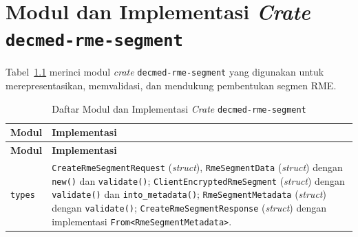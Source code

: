 \chapter{Modul dan Implementasi \textit{Crate} \texttt{decmed-rme-segment}}
\label{lampiran:implementasi-crate-decmed-rme-segment}

Tabel~\ref{tab:modul-crate-decmed-rme-segment} merinci modul \textit{crate} \texttt{decmed-rme-segment} yang digunakan untuk merepresentasikan, memvalidasi, dan mendukung pembentukan segmen RME.

\begingroup
\small
\begin{longtable}{|>{\raggedright\arraybackslash}p{}|>{\raggedright\arraybackslash}p{}|}
	\caption{Daftar Modul dan Implementasi \textit{Crate} \texttt{decmed-rme-segment}}
	\label{tab:modul-crate-decmed-rme-segment}                                                                                                                                                                                                                                                                                                                                                                                                                        \\
	\hline
	\textbf{Modul} & \textbf{Implementasi}                                                                                                                                                                                                                                                                                                                                                                                                                            \\
	\hline
	\endfirsthead
	\hline
	\textbf{Modul} & \textbf{Implementasi}                                                                                                                                                                                                                                                                                                                                                                                                                            \\
	\hline
	\endhead

	\texttt{types}
	               & \texttt{CreateRmeSegmentRequest} (\textit{struct}), \texttt{RmeSegmentData} (\textit{struct}) dengan \texttt{new()} dan \texttt{validate()}; \texttt{ClientEncryptedRmeSegment} (\textit{struct}) dengan \texttt{validate()} dan \texttt{into\_metadata()}; \texttt{RmeSegmentMetadata} (\textit{struct}) dengan \texttt{validate()}; \texttt{CreateRmeSegmentResponse} (\textit{struct}) dengan implementasi \texttt{From<RmeSegmentMetadata>}.
	\\ \hline


\end{longtable}
